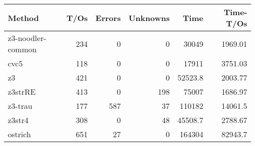 \begin{tabular}{lrrrrr}
\hline
 Method            &   T/Os &   Errors &   Unknowns &     Time &   Time-T/Os \\
\hline
 z3-noodler-common &    234 &        0 &          0 &  30049   &     1969.01 \\
 cvc5              &    118 &        0 &          0 &  17911   &     3751.03 \\
 z3                &    421 &        0 &          0 &  52523.8 &     2003.77 \\
 z3strRE           &    413 &        0 &        198 &  75007   &     1686.97 \\
 z3-trau           &    177 &      587 &         37 & 110182   &    14061.5  \\
 z3str4            &    308 &        0 &         48 &  45508.7 &     2788.67 \\
 ostrich           &    651 &       27 &          0 & 164304   &    82943.7  \\
\hline
\end{tabular}
